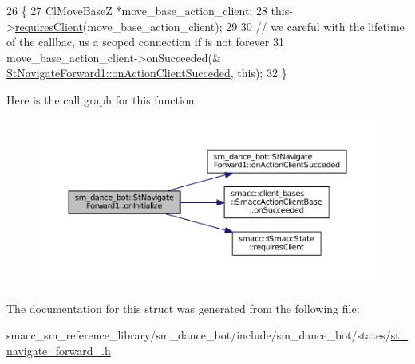 \begin{DoxyCode}
26   \{
27     ClMoveBaseZ *move\_base\_action\_client;
28     this->\hyperlink{classsmacc_1_1ISmaccState_a7f95c9f0a6ea2d6f18d1aec0519de4ac}{requiresClient}(move\_base\_action\_client);
29 
30     \textcolor{comment}{// we careful with the lifetime of the callbac, us a scoped connection if is not forever}
31     move\_base\_action\_client->onSucceeded(&
      \hyperlink{structsm__dance__bot_1_1StNavigateForward1_a82cc8f8303c3b090edfe3b8e6c807b77}{StNavigateForward1::onActionClientSucceded}, \textcolor{keyword}{this});
32   \}
\end{DoxyCode}


Here is the call graph for this function\+:
\nopagebreak
\begin{figure}[H]
\begin{center}
\leavevmode
\includegraphics[width=350pt]{structsm__dance__bot_1_1StNavigateForward1_aca9caa8bd74d17b2d735db4cfb3cfe4c_cgraph}
\end{center}
\end{figure}




The documentation for this struct was generated from the following file\+:\begin{DoxyCompactItemize}
\item 
smacc\+\_\+sm\+\_\+reference\+\_\+library/sm\+\_\+dance\+\_\+bot/include/sm\+\_\+dance\+\_\+bot/states/\hyperlink{st__navigate__forward__1_8h}{st\+\_\+navigate\+\_\+forward\+\_.\+h}\end{DoxyCompactItemize}
